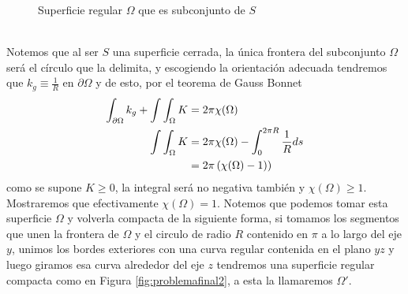 \documentclass[oneside,11pt]{memoir}
\begin{document}
\begin{figure}[h]
\begin{center}

    \end{center}
    \caption{Superficie regular $\Omega$ que es subconjunto de $S$}
    \label{fig:problemafinal1}
\end{figure}
\\ Notemos que al ser $S$ una superficie cerrada, la única frontera del subconjunto $\Omega$ será el círculo que la delimita, y escogiendo la orientación adecuada tendremos que $k_g\equiv \frac{1}{R}$ en $\partial\Omega$ y de esto, por el teorema de Gauss Bonnet
\begin{align}
    \int_{\partial\Omega} k_g+\int\int_\Omega K&=2\pi\chi(\Omega)\notag\\
    \int\int_\Omega K&=2\pi\chi(\Omega)-\int_{0}^{2\pi R} \dfrac{1}{R}ds\notag \\
    &=2\pi\left(\chi(\Omega)-1)\right)\label{eq: GB1} 
\end{align}
 como se supone $K\geq 0$, la integral será no negativa también y $\chi(\Omega)\geq 1$. Mostraremos que efectivamente $\chi(\Omega)=1$. Notemos que podemos tomar esta superficie $\Omega$ y volverla compacta de la siguiente forma, si tomamos los segmentos que unen la frontera de $\Omega$ y el circulo de radio $R$ contenido en $\pi$ a lo largo del eje $y$, unimos los bordes exteriores con una curva regular contenida en el plano $yz$ y luego giramos esa curva alrededor del eje $z$ tendremos una superficie regular compacta como en Figura \ref{fig:problemafinal2}, a esta la llamaremos $\Omega'$. \\
\end{document}
